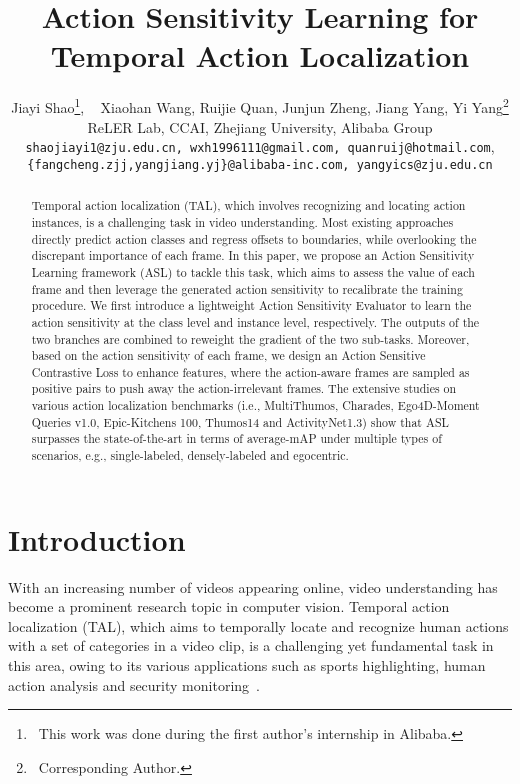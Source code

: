 \documentclass[10pt,twocolumn,letterpaper]{article}
\begin{document}
\title{Action Sensitivity Learning for Temporal Action Localization}



\author{Jiayi Shao\thanks{~This work was done during the first author's internship in Alibaba.},  ~ Xiaohan Wang, Ruijie Quan, Junjun Zheng, Jiang Yang, Yi Yang\thanks{~Corresponding Author.} \\
ReLER Lab, CCAI, Zhejiang University, Alibaba Group \\
{\tt\small{shaojiayi1@zju.edu.cn, wxh1996111@gmail.com, quanruij@hotmail.com}}, \\ {\tt\small{\{fangcheng.zjj,yangjiang.yj\}@alibaba-inc.com, yangyics@zju.edu.cn}}
 }


\maketitle
\ificcvfinal\thispagestyle{empty}\fi

\begin{abstract}
Temporal action localization (TAL), which involves recognizing and locating action instances, is a challenging task in video understanding.
Most existing approaches directly predict action classes and regress offsets to boundaries, while overlooking the discrepant importance of each frame.
In this paper, we propose an Action Sensitivity Learning framework (ASL) to tackle this task, which aims to assess the value of each frame and then leverage the generated action sensitivity to recalibrate the training procedure. We first introduce a lightweight Action Sensitivity Evaluator to learn the action sensitivity at the class level and instance level, respectively. The outputs of the two branches are combined to reweight the gradient of the two sub-tasks. Moreover, based on the action sensitivity of each frame, we design an Action Sensitive Contrastive Loss to enhance features, where the action-aware frames are sampled as positive pairs to push away the action-irrelevant frames. The extensive studies on various action localization benchmarks (i.e., MultiThumos, Charades, Ego4D-Moment Queries v1.0, Epic-Kitchens 100, Thumos14 and ActivityNet1.3) show that ASL surpasses the state-of-the-art in terms of average-mAP under multiple types of scenarios, e.g., single-labeled, densely-labeled and egocentric. 

\end{abstract}

\vspace{-0.5em}
\section{Introduction}
With an increasing number of videos appearing online, video understanding has become a prominent research topic in computer vision. Temporal action localization (TAL), which aims to temporally locate and recognize human actions with a set of categories in a video clip,  is a challenging yet fundamental task in this area, owing to its various applications such as sports highlighting, human action analysis and security monitoring~\cite{app1,app2,app3,app4,app5}.
\end{document}
